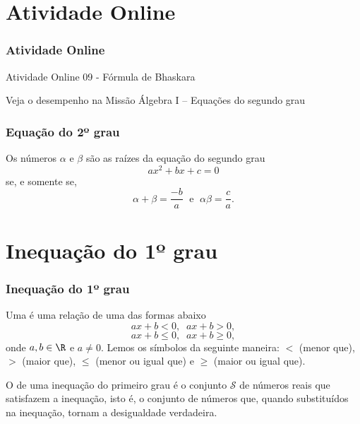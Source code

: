 \documentclass[brazil, notheorems, 10pt]{beamer}
\begin{document}
\section{Atividade Online}
\begin{frame}
\frametitle{Atividade Online} %

{Atividade Online 09 - Fórmula de Bhaskara}


Veja o desempenho na Missão Álgebra I -- Equações do segundo grau

\end{frame}

\begin{frame}
\frametitle{Equação do 2º grau} %

\begin{Teo}
Os números $\alpha$ e $\beta$ são as raízes da equação do segundo
grau $$ax^2+ bx+c=0$$ se, e somente se, $$\alpha + \beta = \frac
{-b} a \; \text{ e } \; \alpha \beta = \frac c a.$$
\end{Teo}

\end{frame}


\section{Inequação do 1º grau}
\begin{frame}
\frametitle{Inequação do 1º grau} %

\begin{Def}
Uma  é uma relação de uma das formas
abaixo $$ax+b <0, \; \; ax+b>0,$$ $$ax+b \leq 0, \; \; ax+b \geq
0,$$ onde $a, b \in \R$ e $ a \neq 0$. Lemos os símbolos da seguinte
maneira: $<$ (menor que), $>$ (maior que), $\leq$ (menor ou igual
que) e $\geq$ (maior ou igual que).
\end{Def}

O  de uma inequação do primeiro grau é o
conjunto $\mathcal{S}$ de números reais que satisfazem a inequação,
isto é, o conjunto de números que, quando substituídos na inequação,
tornam a desigualdade verdadeira.

\end{frame}
\end{document}
